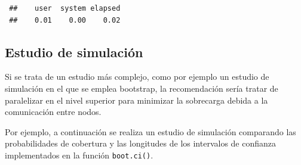 \documentclass[
]{book}
\theoremstyle{break}
\theoremstyle{nonumberplain}
\begin{document}
\begin{verbatim}
 ##    user  system elapsed 
 ##    0.01    0.00    0.02
\end{verbatim}

\hypertarget{estudio-sim-boot}{%
\subsection{Estudio de simulación}\label{estudio-sim-boot}}

Si se trata de un estudio más complejo, como por ejemplo un estudio de simulación en el que se emplea bootstrap, la recomendación sería tratar de paralelizar en el nivel superior para minimizar la sobrecarga debida a la comunicación entre nodos.

Por ejemplo, a continuación se realiza un estudio de simulación comparando las probabilidades de cobertura y las longitudes de los intervalos de confianza implementados en la función \texttt{boot.ci()}.
\end{document}

